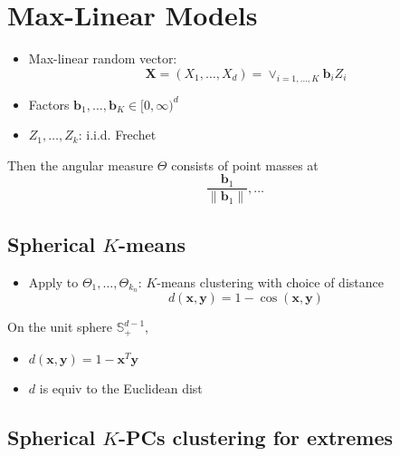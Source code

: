 \documentclass[
  letterpaper,
  DIV=11,
  numbers=noendperiod]{scrreprt}
\providecommand{\tightlist}{%
  \setlength{\itemsep}{0pt}\setlength{\parskip}{0pt}}
\theoremstyle{definition}
\theoremstyle{plain}
\theoremstyle{plain}
\theoremstyle{definition}
\theoremstyle{plain}
\theoremstyle{definition}
\theoremstyle{remark}
\begin{document}
\section{Max-Linear Models}\label{max-linear-models}

\begin{itemize}
\item
  Max-linear random vector: \[
  \pmb{X} = (X_1, \ldots, X_d) = \vee_{i=1, \ldots, K}\pmb{b}_i Z_i
  \]
\item
  Factors \(\pmb{b}_1, \ldots, \pmb{b}_{K} \in [ 0, \infty )^{d}\)
\item
  \(Z_1, \ldots, Z_k\): i.i.d. Frechet
\end{itemize}

Then the angular measure \(\Theta\) consists of point masses at \[
\frac{\pmb{b}_1}{\|\pmb{b}_1\|}, \ldots
\]

\subsection{\texorpdfstring{Spherical
\(K\)-means}{Spherical K-means}}\label{spherical-k-means}

\begin{itemize}
\tightlist
\item
  Apply to \(\Theta_1, \ldots, \Theta_{k_n}\): \(K\)-means clustering
  with choice of distance \[
  d(\pmb{x}, \pmb{y}) = 1- \cos (\pmb{x}, \pmb{y})
  \]
\end{itemize}

On the unit sphere \(\mathbb{S}_{+}^{d-1}\),

\begin{itemize}
\tightlist
\item
  \(d(\pmb{x}, \pmb{y})= 1-\pmb{x}^T\pmb{y}\)
\item
  \(d\) is equiv to the Euclidean dist
\end{itemize}

\subsection{\texorpdfstring{Spherical \(K\)-PCs clustering for
extremes}{Spherical K-PCs clustering for extremes}}\label{spherical-k-pcs-clustering-for-extremes}
\end{document}
